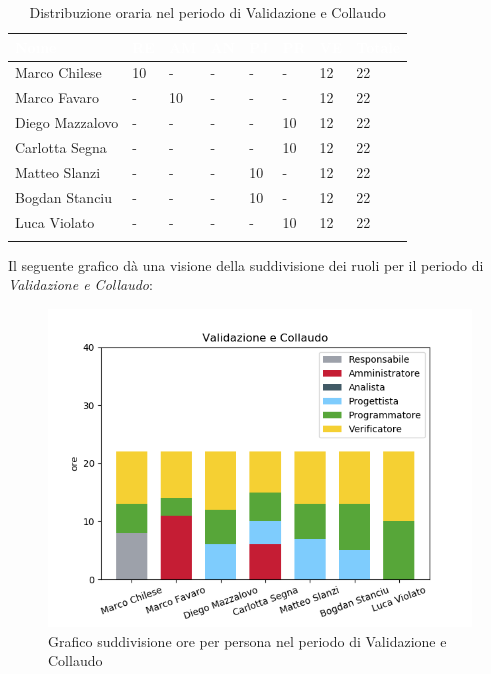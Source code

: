 \begin{longtable}{|C{.30\textwidth}|C{.06\textwidth}|C{.06\textwidth}|C{.06\textwidth} | C{.06\textwidth}| C{.06\textwidth} | C{.06\textwidth} | C{.10\textwidth} |}
	\hline
{}	\textbf{\textcolor{white}{Nome}} & \textbf{\textcolor{white}{RE}} & \textbf{\textcolor{white}{AM}} & \textbf{\textcolor{white}{AN}} & \textbf{\textcolor{white}{PJ}} & \textbf{\textcolor{white}{PR}} & \textbf{\textcolor{white}{VE}} & \textbf{\textcolor{white}{Totale}}\\
	\hline 
	Marco Chilese & 10 & - & - & - & - & 12 & 22 \\
	\hline
	Marco Favaro &  - & 10 & - & - & - & 12 & 22 \\
	\hline
	Diego Mazzalovo & - & - & - & - & 10 & 12 & 22 \\
	\hline
	Carlotta Segna & - & - & - & - & 10 & 12 & 22 \\
	\hline
	Matteo Slanzi & - & - & - & 10 & - & 12 & 22 \\
	\hline
	Bogdan Stanciu & - & - & - & 10 & - & 12 & 22 \\
	\hline
	Luca Violato & - & - & - & - & 10 & 12 & 22 \\   
	\hline
	
	
	\caption{Distribuzione oraria nel periodo di Validazione e Collaudo}
	\label{Distribuzione oraria vc}
\end{longtable}

Il seguente grafico dà una visione della suddivisione dei ruoli per il periodo di \textit{Validazione e Collaudo}:

\begin{figure}[H]
	\centering
	\includegraphics[width=1\linewidth]{./images/fig_vc.png}
	\caption{Grafico suddivisione ore per persona nel periodo di Validazione e Collaudo}
	\label{fig:grafico suddivione ruoli periodo vc}
\end{figure}


